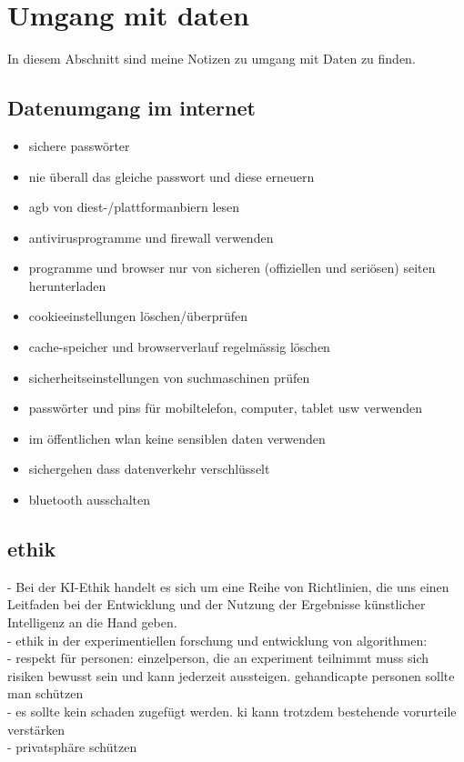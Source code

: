 \section{Umgang mit daten}
\label{sec:Data}

In diesem Abschnitt sind meine Notizen zu umgang mit Daten zu finden.

\subsection{Datenumgang im internet}
\begin{itemize}
    \item sichere passwörter
    \item nie überall das gleiche passwort und diese erneuern
    \item agb von diest-/plattformanbiern lesen
    \item antivirusprogramme und firewall verwenden
    \item programme und browser nur von sicheren (offiziellen und seriösen) seiten herunterladen
    \item cookieeinstellungen löschen/überprüfen
    \item cache-speicher und browserverlauf regelmässig löschen
    \item sicherheitseinstellungen von suchmaschinen prüfen
    \item passwörter und pins für mobiltelefon, computer, tablet usw verwenden
    \item im öffentlichen wlan keine sensiblen daten verwenden
    \item sichergehen dass datenverkehr verschlüsselt
    \item bluetooth ausschalten
\end{itemize}
\citep{datenschutz}

\subsection{ethik}
-  Bei der KI-Ethik handelt es sich um eine Reihe von Richtlinien, die uns einen Leitfaden bei der Entwicklung und der Nutzung der Ergebnisse künstlicher Intelligenz an die Hand geben.\\
-  ethik in der experimentiellen forschung und entwicklung von algorithmen:\\
- respekt für personen: einzelperson, die an experiment teilnimmt muss sich risiken bewusst sein und kann jederzeit aussteigen. gehandicapte personen sollte man schützen\\
- es sollte kein schaden zugefügt werden. ki kann trotzdem bestehende vorurteile verstärken\\
- privatsphäre schützen

\citep{ibm}
